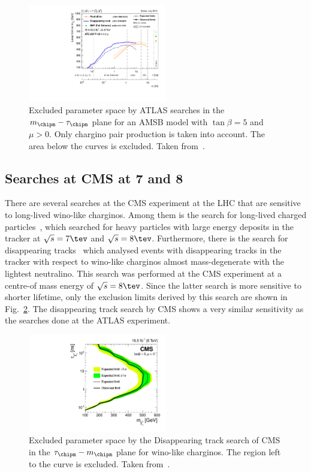 \begin{figure}[!b]
  \centering
      \includegraphics[width=0.54\textwidth]{figures/theory/ATLAS_SUSY_LLPChargino.pdf}
  \caption{Excluded parameter space by ATLAS searches in the $m_{\chipm}-\tau_{\chipm}$ plane for an AMSB model with $\tan\beta=5$ and $\mu>0$. Only chargino pair production is taken into account. The area below the curves is excluded. Taken from~\cite{bib:ATLAS_SUMMARYPLOTS}.}  
  \label{fig:ATLAS}
\end{figure}

\subsection*{Searches at CMS at 7 and 8\tev}
There are several searches at the CMS experiment at the LHC that are sensitive to long-lived wino-like charginos.
Among them is the search for long-lived charged particles~\cite{bib:CMS:HSCP_8TeV}, which searched for heavy particles with large energy deposits in the tracker at $\sqrt{s}=7\tev$  and $\sqrt{s}=8\tev$.
Furthermore, there is the search for disappearing tracks~\cite{bib:CMS:DT_8TeV} which analysed events with disappearing tracks in the tracker with respect to wino-like charginos almost mass-degenerate with the lightest neutralino.
This search was performed at the CMS experiment at a centre-of mass energy of $\sqrt{s}=8\tev$.
Since the latter search is more sensitive to shorter lifetime, only the exclusion limits derived by this search are shown in Fig.~\ref{fig:CMS}.
The disappearing track search by CMS shows a very similar sensitivity as the searches done at the ATLAS experiment.

\begin{figure}[!t]
  \centering
      \includegraphics[width=0.54\textwidth]{figures/theory/lifetimeNs_vs_mass.pdf}
  \caption{Excluded parameter space by the Disappearing track search of CMS in the $\tau_{\chipm}-m_{\chipm}$ plane for wino-like charginos. The region left to the curve is excluded. Taken from~\cite{bib:CMS:DT_8TeV}.}  
  \label{fig:CMS}
\end{figure}

